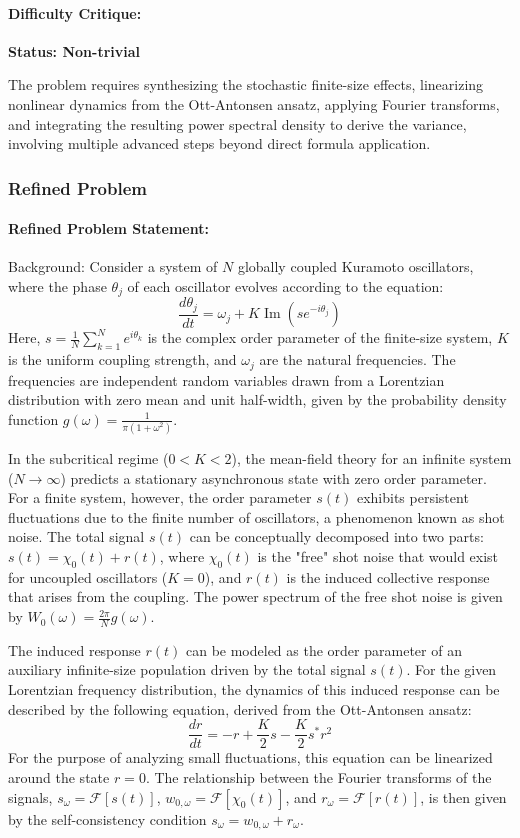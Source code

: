 \documentclass[10pt]{article}
\begin{document}
\paragraph*{Difficulty Critique:}
\textcolor{pass}{\textbf{Status: Non-trivial}}

The problem requires synthesizing the stochastic finite-size effects, linearizing nonlinear dynamics from the Ott-Antonsen ansatz, applying Fourier transforms, and integrating the resulting power spectral density to derive the variance, involving multiple advanced steps beyond direct formula application.


\subsubsection*{Refined Problem}
\paragraph*{Refined Problem Statement:}
Background:
Consider a system of $N$ globally coupled Kuramoto oscillators, where the phase $\theta_j$ of each oscillator evolves according to the equation:
$$ \frac{d\theta_j}{dt} = \omega_j + K \operatorname{Im} (s e^{-i\theta_j}) $$
Here, $s = \frac{1}{N} \sum_{k=1}^N e^{i\theta_k}$ is the complex order parameter of the finite-size system, $K$ is the uniform coupling strength, and $\omega_j$ are the natural frequencies. The frequencies are independent random variables drawn from a Lorentzian distribution with zero mean and unit half-width, given by the probability density function $g(\omega) = \frac{1}{\pi(1+\omega^2)}$.

In the subcritical regime ($0 < K < 2$), the mean-field theory for an infinite system ($N \to \infty$) predicts a stationary asynchronous state with zero order parameter. For a finite system, however, the order parameter $s(t)$ exhibits persistent fluctuations due to the finite number of oscillators, a phenomenon known as shot noise. The total signal $s(t)$ can be conceptually decomposed into two parts: $s(t) = \chi_0(t) + r(t)$, where $\chi_0(t)$ is the "free" shot noise that would exist for uncoupled oscillators ($K=0$), and $r(t)$ is the induced collective response that arises from the coupling. The power spectrum of the free shot noise is given by $W_0(\omega) = \frac{2\pi}{N} g(\omega)$.

The induced response $r(t)$ can be modeled as the order parameter of an auxiliary infinite-size population driven by the total signal $s(t)$. For the given Lorentzian frequency distribution, the dynamics of this induced response can be described by the following equation, derived from the Ott-Antonsen ansatz:
$$ \frac{dr}{dt} = -r + \frac{K}{2}s - \frac{K}{2}s^*r^2 $$
For the purpose of analyzing small fluctuations, this equation can be linearized around the state $r=0$. The relationship between the Fourier transforms of the signals, $s_\omega = \mathcal{F}[s(t)]$, $w_{0,\omega} = \mathcal{F}[\chi_0(t)]$, and $r_\omega = \mathcal{F}[r(t)]$, is then given by the self-consistency condition $s_\omega = w_{0,\omega} + r_\omega$.
\end{document}
